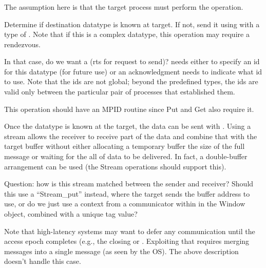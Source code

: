 \documentclass{article}
\begin{document}
\subsubsection{}
\begin{tcp}
The assumption here is that the target process must perform the operation.

Determine if destination datatype is known at target.  If not, send it using
 with a type of .  Note
that if this is a complex datatype, this operation may require a rendezvous.

In that case, do we want a  (rts for
request to send)?  
 needs either to specify an id for this
datatype (for future use) or an acknowledgment needs to indicate what id to
use.  Note that the ids are not global; beyond the predefined types, the ids
are valid only between the particular pair of processes that established them.

This operation should have an MPID routine since Put and Get also require it. 

Once the datatype is known at the target, the data can be sent with
.  Using a stream allows the receiver to receive
part of the data and combine that with the target buffer without either
allocating a temporary buffer the size of the full message or waiting for the
all of data to be delivered.  In fact, a double-buffer arrangement can be used
(the Stream operations should support this).  

Question: how is this stream matched between the sender and receiver?  Should
this use a ``Stream_put'' instead, where the target sends the buffer address
to use, or do we just use a context from a communicator within in the Window
object, combined with a unique tag value?

Note that high-latency systems may want to defer any communication until the
access epoch completes (e.g., the closing  or
.  Exploiting that requires merging messages into a
single message (as seen by the OS).  The above description doesn't handle this
case. 
\end{tcp}
\end{document}
